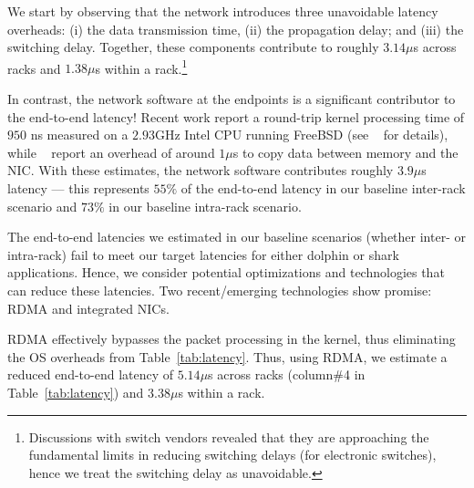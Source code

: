 We start by observing that the network introduces three unavoidable latency overheads: (i) the data transmission time, (ii) the propagation delay; and (iii) the switching delay. 
Together, these components contribute to roughly $3.14\mu$s across racks and $1.38\mu$s within a rack.\footnote{Discussions with switch vendors revealed that they are approaching the fundamental limits in reducing switching delays (for electronic switches), hence we treat the switching delay as unavoidable.} 

In contrast, the network software at the endpoints is a significant contributor to the end-to-end latency! Recent work report a round-trip kernel processing time of $950$ ns measured on a $2.93$GHz Intel CPU running FreeBSD (see ~\cite{luigi} for details), while ~\cite{ramcloud} report 
an overhead of around $1\mu$s to copy data between memory and the NIC.
With these estimates, the network software contributes roughly $3.9\mu$s latency --- this represents $55\%$ of the end-to-end latency in our baseline inter-rack scenario and $73\%$ in our baseline intra-rack scenario.

The end-to-end latencies we estimated in our baseline scenarios (whether inter- or intra-rack) 
fail to meet our target latencies for either dolphin or shark applications. Hence, we consider potential optimizations and technologies that can reduce these latencies. 
Two recent/emerging technologies show promise: RDMA and integrated NICs.




RDMA effectively bypasses the packet processing in the kernel, thus eliminating the OS overheads from Table~\ref{tab:latency}.
Thus, using RDMA, we estimate a reduced end-to-end latency of $5.14\mu$s across racks (column\#4 in Table~\ref{tab:latency}) 
and $3.38\mu$s within a rack.


